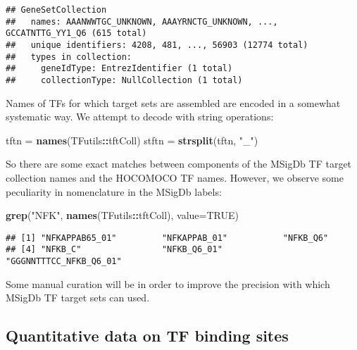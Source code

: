 \documentclass[9pt,a4paper,]{extarticle}
\newenvironment{Shaded}{\begin{snugshade}}{\end{snugshade}}
\newcommand{\KeywordTok}[1]{\textcolor[rgb]{0.13,0.29,0.53}{\textbf{#1}}}
\newcommand{\DataTypeTok}[1]{\textcolor[rgb]{0.13,0.29,0.53}{#1}}
\newcommand{\StringTok}[1]{\textcolor[rgb]{0.31,0.60,0.02}{#1}}
\newcommand{\OtherTok}[1]{\textcolor[rgb]{0.56,0.35,0.01}{#1}}
\newcommand{\OperatorTok}[1]{\textcolor[rgb]{0.81,0.36,0.00}{\textbf{#1}}}
\newcommand{\NormalTok}[1]{#1}
\begin{document}
\begin{verbatim}
## GeneSetCollection
##   names: AAANWWTGC_UNKNOWN, AAAYRNCTG_UNKNOWN, ..., GCCATNTTG_YY1_Q6 (615 total)
##   unique identifiers: 4208, 481, ..., 56903 (12774 total)
##   types in collection:
##     geneIdType: EntrezIdentifier (1 total)
##     collectionType: NullCollection (1 total)
\end{verbatim}

Names of TFs for which target sets are assembled are encoded
in a somewhat systematic way. We attempt to decode with string operations:

\begin{Shaded}
\begin{Highlighting}[]
\NormalTok{tftn =}\StringTok{ }\KeywordTok{names}\NormalTok{(TFutils}\OperatorTok{::}\NormalTok{tftColl)}
\NormalTok{stftn =}\StringTok{ }\KeywordTok{strsplit}\NormalTok{(tftn, }\StringTok{"_"}\NormalTok{)}
\end{Highlighting}
\end{Shaded}

So there are some exact matches between components of the MSigDb
TF target collection names and the HOCOMOCO TF names. However,
we observe some peculiarity in nomenclature in the MSigDb labels:

\begin{Shaded}
\begin{Highlighting}[]
\KeywordTok{grep}\NormalTok{(}\StringTok{"NFK"}\NormalTok{, }\KeywordTok{names}\NormalTok{(TFutils}\OperatorTok{::}\NormalTok{tftColl), }\DataTypeTok{value=}\OtherTok{TRUE}\NormalTok{)}
\end{Highlighting}
\end{Shaded}

\begin{verbatim}
## [1] "NFKAPPAB65_01"         "NFKAPPAB_01"           "NFKB_Q6"              
## [4] "NFKB_C"                "NFKB_Q6_01"            "GGGNNTTTCC_NFKB_Q6_01"
\end{verbatim}

Some manual curation will be in order to improve the precision
with which MSigDb TF target sets can used.

\subsection{Quantitative data on TF binding sites}\label{quantitative-data-on-tf-binding-sites}

{\small}
\end{document}
